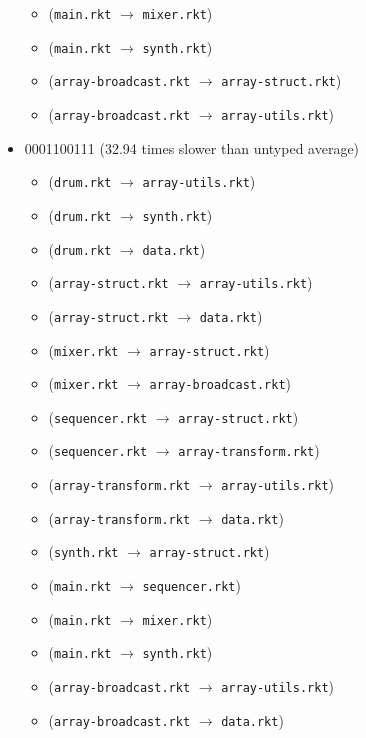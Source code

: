 \documentclass{article}
\newcommand{\mono}[1]{\texttt{#1}}
\begin{document}
\begin{itemize}
\begin{itemize}
  \item (\mono{main.rkt} $\rightarrow$ \mono{mixer.rkt})
  \item (\mono{main.rkt} $\rightarrow$ \mono{synth.rkt})
  \item (\mono{array-broadcast.rkt} $\rightarrow$ \mono{array-struct.rkt})
  \item (\mono{array-broadcast.rkt} $\rightarrow$ \mono{array-utils.rkt})
  \end{itemize}
\item 0001100111 (32.94 times slower than untyped average)
  \begin{itemize}
  \item (\mono{drum.rkt} $\rightarrow$ \mono{array-utils.rkt})
  \item (\mono{drum.rkt} $\rightarrow$ \mono{synth.rkt})
  \item (\mono{drum.rkt} $\rightarrow$ \mono{data.rkt})
  \item (\mono{array-struct.rkt} $\rightarrow$ \mono{array-utils.rkt})
  \item (\mono{array-struct.rkt} $\rightarrow$ \mono{data.rkt})
  \item (\mono{mixer.rkt} $\rightarrow$ \mono{array-struct.rkt})
  \item (\mono{mixer.rkt} $\rightarrow$ \mono{array-broadcast.rkt})
  \item (\mono{sequencer.rkt} $\rightarrow$ \mono{array-struct.rkt})
  \item (\mono{sequencer.rkt} $\rightarrow$ \mono{array-transform.rkt})
  \item (\mono{array-transform.rkt} $\rightarrow$ \mono{array-utils.rkt})
  \item (\mono{array-transform.rkt} $\rightarrow$ \mono{data.rkt})
  \item (\mono{synth.rkt} $\rightarrow$ \mono{array-struct.rkt})
  \item (\mono{main.rkt} $\rightarrow$ \mono{sequencer.rkt})
  \item (\mono{main.rkt} $\rightarrow$ \mono{mixer.rkt})
  \item (\mono{main.rkt} $\rightarrow$ \mono{synth.rkt})
  \item (\mono{array-broadcast.rkt} $\rightarrow$ \mono{array-utils.rkt})
  \item (\mono{array-broadcast.rkt} $\rightarrow$ \mono{data.rkt})
  \end{itemize}


\end{itemize}
\end{document}
